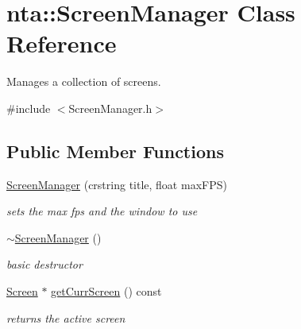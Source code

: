 \hypertarget{classnta_1_1ScreenManager}{}\section{nta\+:\+:Screen\+Manager Class Reference}
\label{classnta_1_1ScreenManager}


Manages a collection of screens.  




{\ttfamily \#include $<$Screen\+Manager.\+h$>$}

\subsection*{Public Member Functions}
\begin{DoxyCompactItemize}
\item 
\mbox{\label{classnta_1_1ScreenManager_a46a7adb4a69fea8e074fa2251c815bad}} 
\hyperlink{classnta_1_1ScreenManager_a46a7adb4a69fea8e074fa2251c815bad}{Screen\+Manager} (crstring title, float max\+F\+PS)
\begin{DoxyCompactList}\small\item\em sets the max fps and the window to use \end{DoxyCompactList}\item 
\mbox{\label{classnta_1_1ScreenManager_aea609a639ffdc377e798eda054e6a4ba}} 
\hyperlink{classnta_1_1ScreenManager_aea609a639ffdc377e798eda054e6a4ba}{$\sim$\+Screen\+Manager} ()
\begin{DoxyCompactList}\small\item\em basic destructor \end{DoxyCompactList}\item 
\mbox{\label{classnta_1_1ScreenManager_a4b26e8adc481bfb37a088e047e4ccc2a}} 
\hyperlink{classnta_1_1Screen}{Screen} $\ast$ \hyperlink{classnta_1_1ScreenManager_a4b26e8adc481bfb37a088e047e4ccc2a}{get\+Curr\+Screen} () const
\begin{DoxyCompactList}\small\item\em returns the active screen \end{DoxyCompactList}\item 
\mbox{\label{classnta_1_1ScreenManager_a18659a2edcddd60d53094ac46ac0b0df}} 

\end{DoxyCompactItemize}

